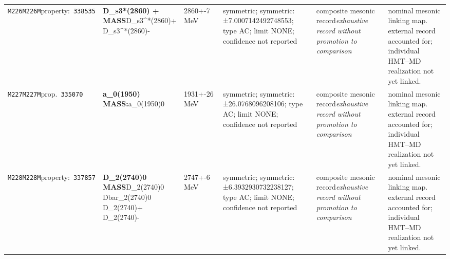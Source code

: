 \begin{landscape}
\begin{longtable}{L{1.85cm}L{4.45cm}L{2.35cm}L{4.05cm}L{3.35cm}L{7.15cm}}
\texttt{M226}\newline \texttt{M226M}\newline property:\ \texttt{338535} & \textbf{D\_\allowbreak{}s3*(2860) + MASS}\newline D\_\allowbreak{}s3\textasciicircum{}*(2860)+ \textbar{}\allowbreak{} D\_\allowbreak{}s3\textasciicircum{}*(2860)- & 2860+-7\,MeV & symmetric; symmetric: ±7.0007142492748553; type AC; limit NONE; confidence not reported & composite mesonic record\newline \emph{exhaustive record without promotion to comparison} & nominal mesonic linking map. external record accounted for; individual HMT--MD realization not yet linked. \\
\texttt{M227}\newline \texttt{M227M}\newline prop.\ \texttt{335070} & \textbf{a\_\allowbreak{}0(1950) MASS:}\newline a\_\allowbreak{}0(1950)0 & 1931+-26\,MeV & symmetric; symmetric: ±26.0768096208106; type AC; limit NONE; confidence not reported & composite mesonic record\newline \emph{exhaustive record without promotion to comparison} & nominal mesonic linking map. external record accounted for; individual HMT--MD realization not yet linked. \\
\texttt{M228}\newline \texttt{M228M}\newline property:\ \texttt{337857} & \textbf{D\_\allowbreak{}2(2740)0 MASS}\newline D\_\allowbreak{}2(2740)0 \textbar{}\allowbreak{} Dbar\_\allowbreak{}2(2740)0 \textbar{}\allowbreak{} D\_\allowbreak{}2(2740)+ \textbar{}\allowbreak{} D\_\allowbreak{}2(2740)- & 2747+-6\,MeV & symmetric; symmetric: ±6.3932930732238127; type AC; limit NONE; confidence not reported & composite mesonic record\newline \emph{exhaustive record without promotion to comparison} & nominal mesonic linking map. external record accounted for; individual HMT--MD realization not yet linked. \\

\end{longtable}
\end{landscape}
